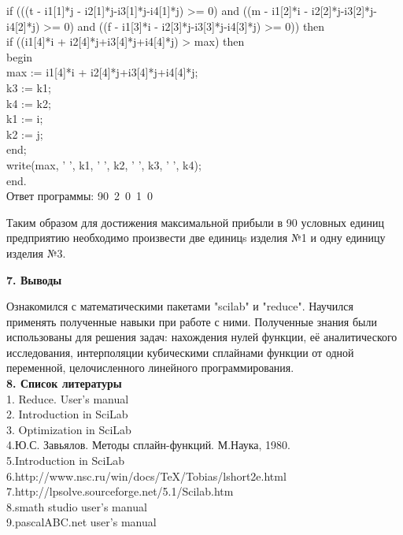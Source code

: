 \documentclass[russian,utf8,nocolumnxxxi,nocolumnxxxii]{eskdtext}
\begin{document}
		if (((t - i1[1]*j - i2[1]*j-i3[1]*j-i4[1]*j) >= 0) and ((m - i1[2]*i - i2[2]*j-i3[2]*j-i4[2]*j) >= 0) and ((f - i1[3]*i - i2[3]*j-i3[3]*j-i4[3]*j) >= 0)) then\\
		
		if ((i1[4]*i + i2[4]*j+i3[4]*j+i4[4]*j) > max) then\\
		
		begin\\
		
			max := i1[4]*i + i2[4]*j+i3[4]*j+i4[4]*j;\\
			
            k3 := k1;\\
            
            k4 := k2;\\
            
			k1 := i;\\
			
			k2 := j;\\
            
    
		end;\\
	write(max, ' ', k1, ' ', k2, ' ', k3, ' ', k4);\\
end.\\


Ответ программы:
90\ 2\ 0\ 1\ 0

Таким образом для достижения максимальной прибыли в 90 условных единиц предприятию необходимо произвести две единицs изделия №1 и одну единицу изделия №3.

\newpage
\begin{equation}\label{7}
\end{equation}
{\bf 7. Выводы}

Ознакомился с математическими пакетами "scilab" и "reduce". Научился применять полученные навыки при работе с ними. Полученные знания были использованы для решения задач: нахождения нулей функции, её аналитического исследования, интерполяции кубическими сплайнами функции от одной переменной, целочисленного линейного программирования.
\newpage
\begin{equation}\label{8}
\end{equation}
{\bf8. Список литературы}
\\1. Reduce. User’s manual
\\2. Introduction in SciLab
\\3. Optimization in SciLab
\\4.Ю.С. Завьялов. Методы сплайн-функций. М.Наука, 1980.
\\5.Introduction in SciLab
\\6.http://www.nsc.ru/win/docs/TeX/Tobias/lshort2e.html
\\7.http://lpsolve.sourceforge.net/5.1/Scilab.htm
\\8.smath studio user’s manual
\\9.pascalABC.net user’s manual
\end{document}
